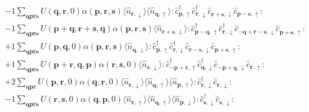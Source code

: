 \begin{align*}
	&-1 \sum_{ \mathbf{q} \mathbf{p} \mathbf{r} \mathbf{s} } U( \mathbf{q}, \mathbf{r}, 0 )  \alpha( \mathbf{p}, \mathbf{r}, \mathbf{s} )   \langle \hat{n}_{ \mathbf{r}, \downarrow } \rangle \langle \hat{n}_{ \mathbf{q}, \uparrow } \rangle :\hat{c}_{ \mathbf{p}, \uparrow }^\dagger \hat{c}_{ \mathbf{r}, \downarrow }^\dagger \hat{c}_{ \mathbf{r}+\mathbf{s}, \downarrow }^{\phantom{\dagger}}\hat{c}_{ \mathbf{p}-\mathbf{s}, \uparrow }^{\phantom{\dagger}}: \\
	&-1 \sum_{ \mathbf{q} \mathbf{p} \mathbf{r} \mathbf{s} } U( \mathbf{p}+\mathbf{q}, \mathbf{r}+\mathbf{s}, \mathbf{q} )  \alpha( \mathbf{p}, \mathbf{r}, \mathbf{s} )   \langle \hat{n}_{ \mathbf{r}+\mathbf{s}, \downarrow } \rangle :\hat{c}_{ \mathbf{p}-\mathbf{q}, \uparrow }^\dagger \hat{c}_{ \mathbf{r}, \downarrow }^\dagger \hat{c}_{ -\mathbf{q}+\mathbf{r}-\mathbf{s}, \downarrow }^{\phantom{\dagger}}\hat{c}_{ \mathbf{p}+\mathbf{s}, \uparrow }^{\phantom{\dagger}}: \\
	&+1 \sum_{ \mathbf{q} \mathbf{p} \mathbf{r} \mathbf{s} } U( \mathbf{p}, \mathbf{q}, 0 )  \alpha( \mathbf{p}, \mathbf{r}, \mathbf{s} )   \langle \hat{n}_{ \mathbf{q}, \downarrow } \rangle :\hat{c}_{ \mathbf{p}, \uparrow }^\dagger \hat{c}_{ \mathbf{r}, \downarrow }^\dagger \hat{c}_{ \mathbf{r}-\mathbf{s}, \downarrow }^{\phantom{\dagger}}\hat{c}_{ \mathbf{p}+\mathbf{s}, \uparrow }^{\phantom{\dagger}}: \\
	&+1 \sum_{ \mathbf{q} \mathbf{p} \mathbf{r} \mathbf{s} } U( \mathbf{p}+\mathbf{r}, \mathbf{q}, \mathbf{p} )  \alpha( \mathbf{r}, \mathbf{s}, 0 )   \langle \hat{n}_{ \mathbf{s}, \downarrow } \rangle :\hat{c}_{ -\mathbf{p}+\mathbf{r}, \uparrow }^\dagger \hat{c}_{ \mathbf{q}, \downarrow }^\dagger \hat{c}_{ -\mathbf{p}+\mathbf{q}, \downarrow }^{\phantom{\dagger}}\hat{c}_{ \mathbf{r}, \uparrow }^{\phantom{\dagger}}: \\
	&+2 \sum_{ \mathbf{q} \mathbf{p} \mathbf{r} } U( \mathbf{p}, \mathbf{r}, 0 )  \alpha( \mathbf{q}, \mathbf{r}, 0 )   \langle \hat{n}_{ \mathbf{r}, \downarrow } \rangle \langle \hat{n}_{ \mathbf{q}, \uparrow } \rangle \langle \hat{n}_{ \mathbf{p}, \uparrow } \rangle :\hat{c}_{ \mathbf{r}, \downarrow }^\dagger \hat{c}_{ \mathbf{r}, \downarrow }^{\phantom{\dagger}}: \\
	&-1 \sum_{ \mathbf{q} \mathbf{p} \mathbf{r} \mathbf{s} } U( \mathbf{r}, \mathbf{s}, 0 )  \alpha( \mathbf{q}, \mathbf{p}, 0 )   \langle \hat{n}_{ \mathbf{r}, \uparrow } \rangle \langle \hat{n}_{ \mathbf{q}, \uparrow } \rangle \langle \hat{n}_{ \mathbf{p}, \downarrow } \rangle :\hat{c}_{ \mathbf{s}, \downarrow }^\dagger \hat{c}_{ \mathbf{s}, \downarrow }^{\phantom{\dagger}}: \\

\end{align*}
